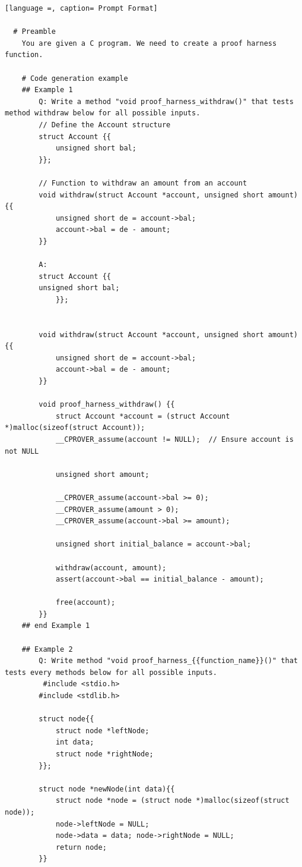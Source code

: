 \documentclass[onecolumn]{NobArticle}
\begin{document}
\begin{lstlisting}[language =, caption= Prompt Format]

  # Preamble
    You are given a C program. We need to create a proof harness function.
    
    # Code generation example
    ## Example 1
        Q: Write a method "void proof_harness_withdraw()" that tests method withdraw below for all possible inputs.
        // Define the Account structure
        struct Account {{
            unsigned short bal;
        }};
    
        // Function to withdraw an amount from an account
        void withdraw(struct Account *account, unsigned short amount) {{ 
            unsigned short de = account->bal;
            account->bal = de - amount; 
        }}
    
        A:
        struct Account {{
        unsigned short bal;
            }};
        
        
        void withdraw(struct Account *account, unsigned short amount) {{
            unsigned short de = account->bal;
            account->bal = de - amount;
        }}
        
        void proof_harness_withdraw() {{
            struct Account *account = (struct Account *)malloc(sizeof(struct Account));
            __CPROVER_assume(account != NULL);  // Ensure account is not NULL
        
            unsigned short amount;
        
            __CPROVER_assume(account->bal >= 0);
            __CPROVER_assume(amount > 0);
            __CPROVER_assume(account->bal >= amount);
        
            unsigned short initial_balance = account->bal;
        
            withdraw(account, amount);
            assert(account->bal == initial_balance - amount);
        
            free(account);
        }}
	## end Example 1
		
	## Example 2
		Q: Write method "void proof_harness_{{function_name}}()" that tests every methods below for all possible inputs.
         #include <stdio.h>
		#include <stdlib.h>
		
		struct node{{
		    struct node *leftNode;
		    int data;
		    struct node *rightNode;
		}};
		
		struct node *newNode(int data){{
		    struct node *node = (struct node *)malloc(sizeof(struct node));
		    node->leftNode = NULL;
		    node->data = data; node->rightNode = NULL;
		    return node;
		}}
		

\end{lstlisting}
\end{document}
